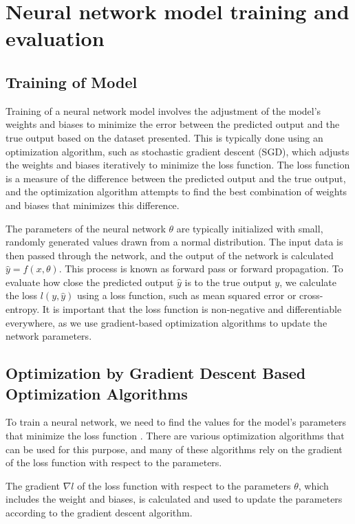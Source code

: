 \section{Neural network model training and evaluation} 
\subsection{Training of Model}
Training of a neural network model involves the adjustment of the model's weights and biases to minimize the error between the predicted output and the true output based on the dataset presented. This is typically done using an optimization algorithm, such as stochastic gradient descent (SGD), which adjusts the weights and biases iteratively to minimize the loss function. The loss function is a measure of the difference between the predicted output and the true output, and the optimization algorithm attempts to find the best combination of weights and biases that minimizes this difference.

The parameters of the neural network $\theta$ are typically initialized with small, randomly generated values drawn from a normal distribution. The input data is then passed through the network, and the output of the network is calculated $ \hat{y} = f(x, \theta)$. This process is known as forward pass or forward propagation. To evaluate how close the predicted output $\hat{y}$ is to the true output $y$, we calculate the loss $l(y,\hat{y})$ using a loss function, such as mean squared error or cross-entropy. It is important that the loss function is non-negative and differentiable everywhere, as we use gradient-based optimization algorithms to update the network parameters.

\subsection{Optimization by Gradient Descent Based Optimization Algorithms}

To train a neural network, we need to find the values for the model's parameters that minimize the loss function \cite{Goodfellow-et-al-2016}. There are various optimization algorithms that can be used for this purpose, and many of these algorithms rely on the gradient of the loss function with respect to the parameters. 

The gradient $\nabla l$ of the loss function with respect to the parameters $\theta$, which includes the weight and biases, is calculated and used to update the parameters according to the gradient descent algorithm.

